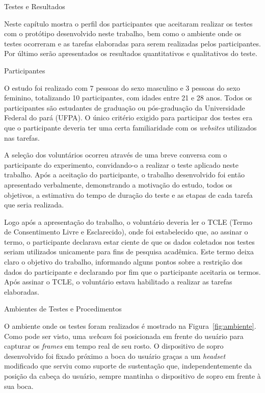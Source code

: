 \begin{chapter}{Testes e Resultados}

Neste capítulo mostra o perfil dos participantes que aceitaram realizar os
testes com o protótipo desenvolvido neste trabalho, bem como o ambiente onde os
testes ocorreram e as tarefas elaboradas para serem realizadas pelos
participantes.  Por último serão apresentados os resultados quantitativos e
qualitativos do teste.  %


\begin{section}{Participantes}

O estudo foi realizado com 7 pessoas do sexo masculino e 3 pessoas do sexo
feminino, totalizando 10 participantes, com idades entre 21 e 28 anos.
Todos os participantes são estudantes de graduação ou pós-graduação da
Universidade Federal do pará (UFPA). O único critério exigido para participar
dos testes era que o participante deveria ter uma certa familiaridade com os
\textit{websites} utilizados nas tarefas.  

A seleção dos voluntários ocorreu através de uma breve conversa com o
participante do experimento, convidando-o a realizar o teste aplicado neste
trabalho. Após a aceitação do participante, o trabalho desenvolvido foi então
apresentado verbalmente, demonstrando a motivação do estudo, todos os objetivos,
a estimativa do tempo de duração do teste e as etapas de cada tarefa que
seria realizada. 
 
Logo após a apresentação do trabalho, o voluntário deveria ler o TCLE (Termo de
Consentimento Livre e Esclarecido), onde foi estabelecido que, ao assinar o
termo, o participante declarava estar ciente de que os dados coletados nos
testes seriam utilizados unicamente para fins de pesquisa acadêmica. Este termo
deixa claro o objetivo do trabalho, informando alguns pontos sobre a restrição
dos dados do participante e declarando por fim que o participante aceitaria os
termos. Após assinar o TCLE, o voluntário estava habilitado a realizar as
tarefas elaboradas. 

\end{section}

\begin{section}{Ambientes de Testes e Procedimentos}

O ambiente onde os testes foram realizados é mostrado na
Figura~\ref{fig:ambiente}.  Como pode ser visto, uma \textit{webcam} foi
posicionada em frente do usuário para capturar os \textit{frames} em tempo real
de seu rosto. O dispositivo de sopro desenvolvido foi fixado próximo a boca do
usuário graças a um \textit{headset} modificado que serviu como suporte de
sustentação que, independentemente da posição da cabeça do usuário, sempre
mantinha o dispositivo de sopro em frente à sua boca.


\end{section}
\end{chapter}
